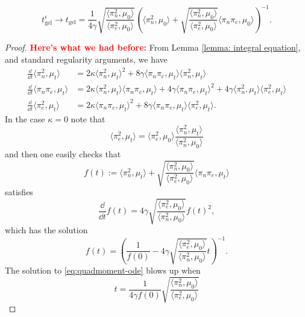 \begin{lemma}
\begin{equation}
    t_\text{gel}^\epsilon \rightarrow t_\text{gel} =\frac{1}{4\gamma}\sqrt{\frac{\langle \pi_n^2, \mu_0\rangle}{\langle \pi_e^2, \mu_0\rangle}}\left(\langle \pi_n^2, \mu_0\rangle+\sqrt{\frac{\langle \pi_n^2, \mu_0\rangle}{\langle \pi_e^2, \mu_0\rangle}}\langle \pi_n\pi_e, \mu_0\rangle \right)^{-1}.
\end{equation}  \end{lemma} \begin{proof} \textcolor{red}{\textbf{Here's what we had before:}} From Lemma \ref{lemma: integral equation}, and standard regularity arguments, we have 
\begin{align}
    \frac{\dd}{\dd t}\langle \pi_n^2, \mu_t\rangle &=
    2\kappa \langle \pi_n^2, \mu_t\rangle^2
    + 8 \gamma \langle \pi_n \pi_e, \mu_t\rangle\langle \pi_n^2, \mu_t\rangle\\
    \frac{\dd}{\dd t}\langle \pi_n \pi_e, \mu_t\rangle &=
    2\kappa \langle \pi_n^2, \mu_t\rangle \langle \pi_n \pi_e, \mu_t\rangle
    + 4 \gamma \langle \pi_n \pi_e, \mu_t\rangle^2
    + 4 \gamma \langle \pi_n^2, \mu_t\rangle\langle \pi_e^2, \mu_t\rangle\\
    \frac{\dd}{\dd t}\langle \pi_e^2, \mu_t\rangle &=
    2\kappa \langle \pi_n \pi_e, \mu_t\rangle^2
    + 8 \gamma \langle \pi_n \pi_e, \mu_t\rangle\langle \pi_e^2, \mu_t\rangle.
\end{align}
In the case $\kappa = 0$ note that
\begin{equation}\label{eq:proportional}
    \langle \pi_e^2, \mu_t\rangle = \langle \pi_e^2, \mu_0\rangle
    \frac{\langle \pi_n^2, \mu_t\rangle}{\langle \pi_n^2, \mu_0\rangle}
\end{equation}
and then one easily checks that
\begin{equation}
    f(t) := \langle \pi_n^2, \mu_t\rangle
           + \sqrt{\frac{\langle \pi_n^2, \mu_0\rangle}
                        {\langle \pi_e^2, \mu_0\rangle}}
             \langle \pi_n \pi_e, \mu_t\rangle
\end{equation}
satisfies
\begin{equation*}
    \frac{\dd }{\dd t}f(t) = 4\gamma 
    \sqrt{\frac{\langle \pi_e^2, \mu_0\rangle}
                        {\langle \pi_n^2, \mu_0\rangle}}f(t)^2,
\end{equation*}
which has the solution
\begin{equation}\label{eq:quadmoment-ode}
    f(t) = \left(\frac{1}{f(0)} - 4\gamma 
    \sqrt{\frac{\langle \pi_e^2, \mu_0\rangle}
                        {\langle \pi_n^2, \mu_0\rangle}}t \right)^{-1}.
\end{equation}
The solution to \eqref{eq:quadmoment-ode} blows up when
\begin{equation}\label{eq:quad-tgel}
    t = \frac{1}{4\gamma f(0)}
             \sqrt{\frac{\langle \pi_n^2, \mu_0\rangle}
                        {\langle \pi_e^2, \mu_0\rangle}}
\end{equation}


\end{proof}
